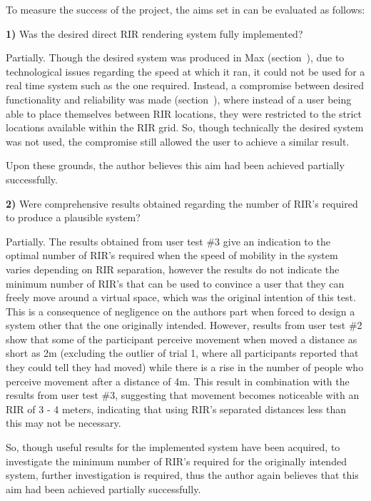 \documentclass[../../main.tex]{subfiles}
\begin{document}
			To measure the success of the project, the aims set in  can be evaluated as follows:

			\textbf{1)} Was the desired direct \ac{RIR} rendering system fully implemented?

				Partially. Though the desired system was produced in Max (section~), due to technological issues regarding the speed at which it ran, it could not be used for a real time system such as the one required. Instead, a compromise between desired functionality and reliability was made (section~), where instead of a user being able to place themselves between \ac{RIR} locations, they were restricted to the strict locations available within the \ac{RIR} grid. So, though technically the desired system was not used, the compromise still allowed the user to achieve a similar result.

				Upon these grounds, the author believes this aim had been achieved partially successfully.


			\textbf{2)} Were comprehensive results obtained regarding the number of \ac{RIR}'s required to produce a plausible system?


				Partially. The results obtained from user test \#3 give an indication to the optimal number of \ac{RIR}'s required when the speed of mobility in the system varies depending on \ac{RIR} separation, however the results do not indicate the minimum number of \ac{RIR}'s that can be used to convince a user that they can freely move around a virtual space, which was the original intention of this test. This is a consequence of negligence on the authors part when forced to design a system other that the one originally intended. However, results from user test \#2 show that some of the participant perceive movement when moved a distance as short as 2m (excluding the outlier of trial 1, where all participants reported that they could tell they had moved) while there is a rise in the number of people who perceive movement after a distance of 4m. This result in combination with the results from user test \#3, suggesting that movement becomes noticeable with an \ac{RIR} of 3 - 4 meters, indicating that using \ac{RIR}'s separated distances less than this may not be necessary.

				So, though useful results for the implemented system have been acquired, to investigate the minimum number of \ac{RIR}'s required for the originally intended system, further investigation is required, thus the author again believes that this aim had been achieved partially successfully.
\end{document}

